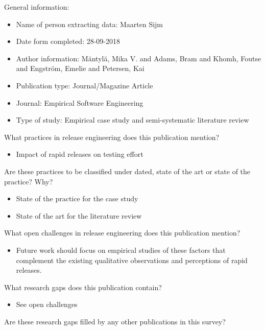\documentclass[]{book}
\providecommand{\tightlist}{%
  \setlength{\itemsep}{0pt}\setlength{\parskip}{0pt}}
\begin{document}
General information:

\begin{itemize}
\tightlist
\item
  Name of person extracting data: Maarten Sijm
\item
  Date form completed: 28-09-2018
\item
  Author information: Mäntylä, Mika V. and Adams, Bram and Khomh, Foutse
  and Engström, Emelie and Petersen, Kai
\item
  Publication type: Journal/Magazine Article
\item
  Journal: Empirical Software Engineering
\item
  Type of study: Empirical case study and semi-systematic literature
  review
\end{itemize}

What practices in release engineering does this publication mention?

\begin{itemize}
\tightlist
\item
  Impact of rapid releases on testing effort
\end{itemize}

Are these practices to be classified under dated, state of the art or
state of the practice? Why?

\begin{itemize}
\tightlist
\item
  State of the practice for the case study
\item
  State of the art for the literature review
\end{itemize}

What open challenges in release engineering does this publication
mention?

\begin{itemize}
\tightlist
\item
  Future work should focus on empirical studies of these factors that
  complement the existing qualitative observations and perceptions of
  rapid releases.
\end{itemize}

What research gaps does this publication contain?

\begin{itemize}
\tightlist
\item
  See open challenges
\end{itemize}

Are these research gaps filled by any other publications in this survey?
\end{document}
